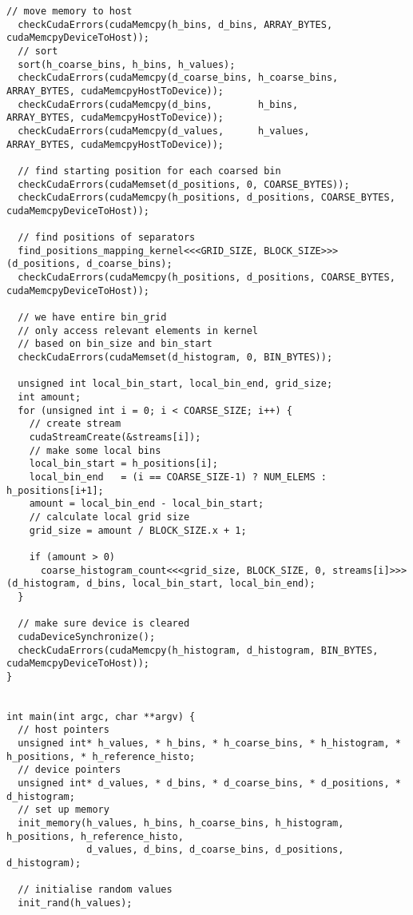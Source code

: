 \begin{lstlisting}[captionpos=t, xleftmargin=0.0pt, xrightmargin=0.0pt, caption={Coarse Histogram implementation}, label={lst:coarse histogram impl}]
  // move memory to host
  checkCudaErrors(cudaMemcpy(h_bins, d_bins, ARRAY_BYTES, cudaMemcpyDeviceToHost));
  // sort
  sort(h_coarse_bins, h_bins, h_values);
  checkCudaErrors(cudaMemcpy(d_coarse_bins, h_coarse_bins,  ARRAY_BYTES, cudaMemcpyHostToDevice));
  checkCudaErrors(cudaMemcpy(d_bins,        h_bins,         ARRAY_BYTES, cudaMemcpyHostToDevice));
  checkCudaErrors(cudaMemcpy(d_values,      h_values,       ARRAY_BYTES, cudaMemcpyHostToDevice));

  // find starting position for each coarsed bin
  checkCudaErrors(cudaMemset(d_positions, 0, COARSE_BYTES));
  checkCudaErrors(cudaMemcpy(h_positions, d_positions, COARSE_BYTES, cudaMemcpyDeviceToHost));

  // find positions of separators
  find_positions_mapping_kernel<<<GRID_SIZE, BLOCK_SIZE>>>(d_positions, d_coarse_bins);
  checkCudaErrors(cudaMemcpy(h_positions, d_positions, COARSE_BYTES, cudaMemcpyDeviceToHost));
  
  // we have entire bin_grid
  // only access relevant elements in kernel
  // based on bin_size and bin_start
  checkCudaErrors(cudaMemset(d_histogram, 0, BIN_BYTES));

  unsigned int local_bin_start, local_bin_end, grid_size;
  int amount;
  for (unsigned int i = 0; i < COARSE_SIZE; i++) {
    // create stream
    cudaStreamCreate(&streams[i]);
    // make some local bins
    local_bin_start = h_positions[i];
    local_bin_end   = (i == COARSE_SIZE-1) ? NUM_ELEMS : h_positions[i+1];
    amount = local_bin_end - local_bin_start;
    // calculate local grid size
    grid_size = amount / BLOCK_SIZE.x + 1;

    if (amount > 0) 
      coarse_histogram_count<<<grid_size, BLOCK_SIZE, 0, streams[i]>>>(d_histogram, d_bins, local_bin_start, local_bin_end);
  }

  // make sure device is cleared
  cudaDeviceSynchronize();
  checkCudaErrors(cudaMemcpy(h_histogram, d_histogram, BIN_BYTES, cudaMemcpyDeviceToHost));
}


int main(int argc, char **argv) {
  // host pointers
  unsigned int* h_values, * h_bins, * h_coarse_bins, * h_histogram, * h_positions, * h_reference_histo;
  // device pointers
  unsigned int* d_values, * d_bins, * d_coarse_bins, * d_positions, * d_histogram;
  // set up memory
  init_memory(h_values, h_bins, h_coarse_bins, h_histogram, h_positions, h_reference_histo,
              d_values, d_bins, d_coarse_bins, d_positions, d_histogram);

  // initialise random values
  init_rand(h_values);


\end{lstlisting}
